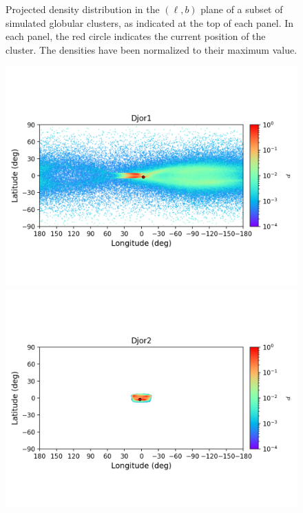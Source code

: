 \begin{figure}
\begin{center}
            \end{center}
            \caption[Projected density distribution in the $(\ell, b)$ of each cluster's tidal debris]{Projected density distribution in the $(\ell, b)$ plane of a subset of simulated globular clusters, as indicated at the top of each panel. In each panel, the red circle indicates the current position of the cluster. The densities have been normalized to their maximum value.}
            \label{stream1}
        \end{figure}

        \begin{figure}
            \begin{center}
                \includegraphics[clip=true, trim = 0mm 20mm 0mm 10mm, width=1\columnwidth]{images/error_plots_Djor1.png}
                \includegraphics[clip=true, trim = 0mm 20mm 0mm 10mm, width=1\columnwidth]{images/error_plots_Djor2.png}

\end{center}
\end{figure}
